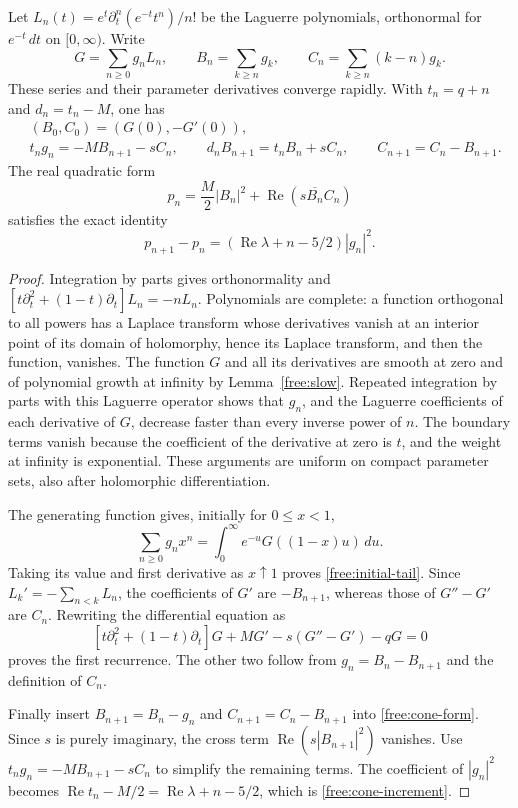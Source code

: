 \begin{lemma}\label{free:laguerre}
Let $L_n(t)=e^t\partial_t^n(e^{-t}t^n)/n!$ be the Laguerre polynomials,
orthonormal for $e^{-t}\,dt$ on $[0,\infty)$.  Write
\[
 G=\sum_{n\ge0}g_nL_n,\qquad
 B_n=\sum_{k\ge n}g_k,\qquad C_n=\sum_{k\ge n}(k-n)g_k.
\]
These series and their parameter derivatives converge rapidly.  With
$t_n=q+n$ and $d_n=t_n-M$, one has
\begin{align}
 &(B_0,C_0)=(G(0),-G'(0)),\label{free:initial-tail}\\
 &t_ng_n=-MB_{n+1}-sC_n,\qquad
 d_nB_{n+1}=t_nB_n+sC_n,\qquad
 C_{n+1}=C_n-B_{n+1}.\label{free:recurrence}
\end{align}
The real quadratic form
\begin{equation}\label{free:cone-form}
 p_n=\frac M2|B_n|^2+\operatorname{Re}(s\overline{B_n}C_n)
\end{equation}
satisfies the exact identity
\begin{equation}\label{free:cone-increment}
 p_{n+1}-p_n=
 (\operatorname{Re}\lambda+n-5/2)|g_n|^2.
\end{equation}
\end{lemma}

\begin{proof}
Integration by parts gives orthonormality and
$[t\partial_t^2+(1-t)\partial_t]L_n=-nL_n$.
Polynomials are complete: a function orthogonal to all powers has a
Laplace transform whose derivatives vanish at an interior point of its
domain of holomorphy, hence its Laplace transform, and then the function,
vanishes.  The function $G$ and all its derivatives are smooth at zero
and of polynomial growth at infinity by Lemma~\ref{free:slow}.
Repeated integration by parts with this Laguerre operator shows that
$g_n$, and the Laguerre coefficients of each derivative of $G$, decrease
faster than every inverse power of $n$.  The boundary terms vanish
because the coefficient of the derivative at zero is $t$, and the
weight at infinity is exponential.  These arguments are uniform on
compact parameter sets, also after holomorphic differentiation.

The generating function gives, initially for $0\le x<1$,
\[
 \sum_{n\ge0}g_nx^n=
 \int_0^\infty e^{-u}G((1-x)u)\,du.
\]
Taking its value and first derivative as $x\uparrow1$ proves
\eqref{free:initial-tail}.  Since
$L_k'=-\sum_{n<k}L_n$, the coefficients of $G'$ are $-B_{n+1}$,
whereas those of $G''-G'$ are $C_n$.  Rewriting the differential equation
as
\[
 [t\partial_t^2+(1-t)\partial_t]G+MG'-s(G''-G')-qG=0
\]
proves the first recurrence.  The other two follow from
$g_n=B_n-B_{n+1}$ and the definition of $C_n$.

Finally insert $B_{n+1}=B_n-g_n$ and
$C_{n+1}=C_n-B_{n+1}$ into \eqref{free:cone-form}.  Since $s$ is purely
imaginary, the cross term $\operatorname{Re}(s|B_{n+1}|^2)$ vanishes.
Use $t_ng_n=-MB_{n+1}-sC_n$ to simplify the remaining terms.  The
coefficient of $|g_n|^2$ becomes
$\operatorname{Re}t_n-M/2=\operatorname{Re}\lambda+n-5/2$, which is
\eqref{free:cone-increment}.
\end{proof}

